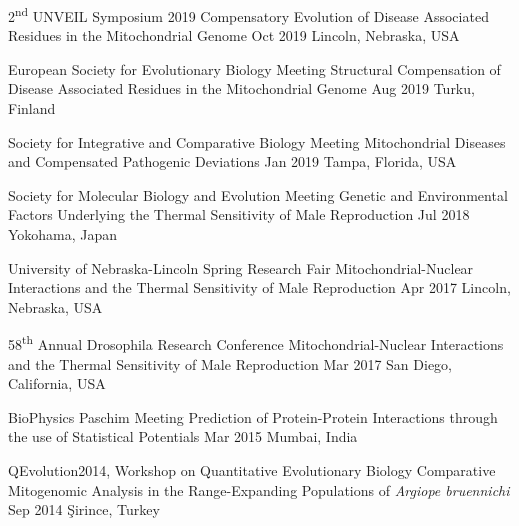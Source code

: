 \begin{cventries}
 \cvpresentation
    {2\textsuperscript{nd} UNVEIL Symposium 2019}
    {Compensatory Evolution of Disease Associated Residues in the Mitochondrial Genome}
    {Oct 2019}
    {Lincoln, Nebraska, USA} 

  \cvpresentation
    {European Society for Evolutionary Biology Meeting} %
    {Structural Compensation of Disease Associated Residues in the Mitochondrial Genome} %
    {Aug 2019} %
    {Turku, Finland} %
    
  \cvpresentation
    {Society for Integrative and Comparative Biology Meeting}
    {Mitochondrial Diseases and Compensated Pathogenic Deviations}
    {Jan 2019}
    {Tampa, Florida, USA}
    
  \cvpresentation
    {Society for Molecular Biology and Evolution Meeting}
    {Genetic and Environmental Factors Underlying the Thermal Sensitivity of Male Reproduction}
    {Jul 2018}
    {Yokohama, Japan}
    
  \cvpresentation
    {University of Nebraska-Lincoln Spring Research Fair}
    {Mitochondrial-Nuclear Interactions and the Thermal Sensitivity of Male Reproduction}
    {Apr 2017}
    {Lincoln, Nebraska, USA}
    
  \cvpresentation
    {58\textsuperscript{th} Annual Drosophila Research Conference}
    {Mitochondrial-Nuclear Interactions and the Thermal Sensitivity of Male Reproduction}
    {Mar 2017}
    {San Diego, California, USA}
    
   \cvpresentation
    {BioPhysics Paschim Meeting}
    {Prediction of Protein-Protein Interactions through the use of Statistical Potentials}
    {Mar 2015}
    {Mumbai, India}
    
  \cvpresentation
    {QEvolution2014, Workshop on Quantitative Evolutionary Biology}
    {Comparative Mitogenomic Analysis in the Range-Expanding Populations of \textit{Argiope bruennichi}}
    {Sep 2014}
    {\c{S}irince, Turkey}        
\end{cventries}
